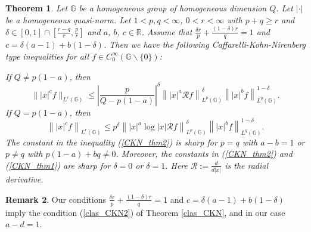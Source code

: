 \documentclass[a4paper,12pt,reqno]{amsart}
\renewcommand\eqref[1]{(\ref{#1})} %
\numberwithin{equation}{section}
\theoremstyle{plain}
\newtheorem{thm}{Theorem}[section]
\theoremstyle{definition}
\newtheorem{rem}[thm]{Remark}
\begin{document}
\begin{thm}\label{CKN_thm}
Let $\mathbb{G}$ be a homogeneous group
of homogeneous dimension $Q$. Let $|\cdot|$ be a homogeneous quasi-norm. Let $1<p,q<\infty$, $0<r<\infty$ with $p+q\geq r$ and $\delta\in[0,1]\cap\left[\frac{r-q}{r},\frac{p}{r}\right]$ and $a$, $b$, $c\in\mathbb{R}$. Assume that $\frac{\delta r}{p}+\frac{(1-\delta)r}{q}=1$ and $c=\delta(a-1)+b(1-\delta)$. Then we have the following Caffarelli-Kohn-Nirenberg type inequalities for all $f\in C_{0}^{\infty}(\mathbb{G}\backslash\{0\})$:

If $Q\neq p(1-a)$, then
\begin{equation}\label{CKN_thm2}
\||x|^{c}f\|_{L^{r}(\mathbb{G})}
\leq \left|\frac{p}{Q-p(1-a)}\right|^{\delta} \left\||x|^{a}\mathcal{R}f\right\|^{\delta}_{L^{p}(\mathbb{G})}
\left\||x|^{b}f\right\|^{1-\delta}_{L^{q}(\mathbb{G})}.
\end{equation}
If $Q=p(1-a)$, then
\begin{equation}\label{CKN_thm1}
\left\||x|^{c}f\right\|_{L^{r}(\mathbb{G})}
\leq p^{\delta} \left\||x|^{a}\log|x|\mathcal{R}f\right\|^{\delta}_{L^{p}(\mathbb{G})}
\left\||x|^{b}f\right\|^{1-\delta}_{L^{q}(\mathbb{G})}.
\end{equation}
The constant in the inequality \eqref{CKN_thm2} is sharp for $p=q$ with $a-b=1$ or $p\neq q$ with $p(1-a)+bq\neq0$. Moreover, the constants in \eqref{CKN_thm2} and \eqref{CKN_thm1} are sharp for $\delta=0$ or $\delta=1$. Here $\mathcal{R}:=\frac{d}{d|x|}$ is the radial derivative.
\end{thm}
\begin{rem} Our conditions $\frac{\delta r}{p}+\frac{(1-\delta)r}{q}=1$ and $c=\delta(a-1)+b(1-\delta)$ imply the condition \eqref{clas_CKN2} of Theorem \ref{clas_CKN}, and in our case $a-d=1$.
\end{rem}
\end{document}
